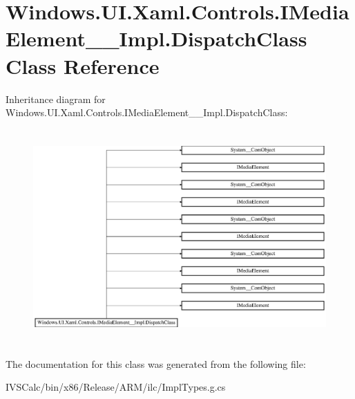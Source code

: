 \hypertarget{class_windows_1_1_u_i_1_1_xaml_1_1_controls_1_1_i_media_element_____impl_1_1_dispatch_class}{}\section{Windows.\+U\+I.\+Xaml.\+Controls.\+I\+Media\+Element\+\_\+\+\_\+\+Impl.\+Dispatch\+Class Class Reference}
\label{class_windows_1_1_u_i_1_1_xaml_1_1_controls_1_1_i_media_element_____impl_1_1_dispatch_class}
Inheritance diagram for Windows.\+U\+I.\+Xaml.\+Controls.\+I\+Media\+Element\+\_\+\+\_\+\+Impl.\+Dispatch\+Class\+:\begin{figure}[H]
\begin{center}
\leavevmode
\includegraphics[height=8.235293cm]{class_windows_1_1_u_i_1_1_xaml_1_1_controls_1_1_i_media_element_____impl_1_1_dispatch_class}
\end{center}
\end{figure}


The documentation for this class was generated from the following file\+:\begin{DoxyCompactItemize}
\item 
I\+V\+S\+Calc/bin/x86/\+Release/\+A\+R\+M/ilc/Impl\+Types.\+g.\+cs\end{DoxyCompactItemize}
